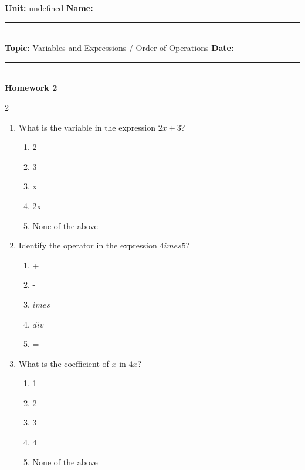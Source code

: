 \documentclass[10pt]{article}
\begin{document}
\enlargethispage{2.5cm}

\begin{tcolorbox}[colback=mainblue!5, colframe=mainblue, sharp corners, boxrule=0.5pt]
    \small \textbf{Unit:} undefined \hfill \textbf{Name:} \rule{3cm}{0.4pt} \\
    \small \textbf{Topic:} Variables and Expressions / Order of Operations \hfill \textbf{Date:} \rule{2cm}{0.4pt} \\
    \centering \textbf{\large Homework 2}
\end{tcolorbox}

\vspace{0.2cm}

\begin{multicols}{2}
\begin{enumerate}[label=\textbf{Q\arabic*.}, leftmargin=*, itemsep=6pt, parsep=0pt]

  \item \small What is the variable in the expression $2x + 3$?
  \begin{enumerate}[label=(\Alph*), leftmargin=0.6cm, nosep, itemsep=2pt]
    \item 2
    \item 3
    \item x
    \item 2x
    \item None of the above
  \end{enumerate}

  \item \small Identify the operator in the expression $4 	imes 5$?
  \begin{enumerate}[label=(\Alph*), leftmargin=0.6cm, nosep, itemsep=2pt]
    \item +
    \item -
    \item $	imes$
    \item $div$
    \item =
  \end{enumerate}

  \item \small What is the coefficient of $x$ in $4x$?
  \begin{enumerate}[label=(\Alph*), leftmargin=0.6cm, nosep, itemsep=2pt]
    \item 1
    \item 2
    \item 3
    \item 4
    \item None of the above
  \end{enumerate}


\end{enumerate}
\end{multicols}
\end{document}
